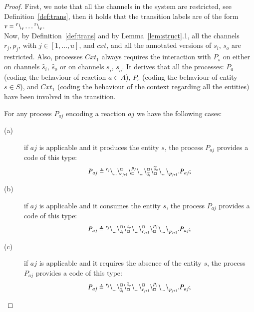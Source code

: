  \begin{proof}
 First, we note that all the channels in the system are restricted, see Definition~\ref{def:trans}, then
 it holds that the transition labels are of the form  $v={}^{\tau} \backslash_{\tau}^{}\dots{}^{\tau} \backslash_{\tau}^{}$.\\
 Now,
by Definition~\ref{def:trans} and by Lemma~\ref{lem:struct}.1, all the  channels $r_j,p_j$, with
 $j \in [1,\dots,u]$, and $cxt$,
  and all the annotated versions of 
 $s_i$, $s_o$ are restricted. Also, processes $\mathit{Cxt}_1$ always requires the 
 interaction with $P_s$ on either on channels $\widehat{s}_i$, $\widehat{s}_o$ or on channels 
 $\underline{s}_i$, $\underline{s}_o$.
 It derives that all the processes: $P_a$  (coding the behaviour of reaction $a \in A$), $P_s$ (coding the behaviour of entity $s \in S$), and $\mathit{Cxt}_1$ (coding the behaviour of the context regarding all the entities) have been involved in the transition. 

For any process $P_{aj}$ encoding a reaction $aj$ we have the following cases:
\begin{description}
\item[(a)] 
if $aj$ is applicable and it produces the entity $s$,  
the process $P_{aj}$ provides a code of this type:
$$P_{aj}\triangleq {}^{r_j} \backslash_{\dots}^{}\backslash_{r_{j+1}}^{\scriptstyle {\square}}\backslash_{\scriptstyle {\square}}^{p_j}{}^{} \backslash_{\dots}^{}\backslash_{\widetilde{s}_i}^{\scriptstyle {\square}}\backslash_{\scriptstyle {\square}}^{\widetilde{s}_o}{}^{} \backslash_{\dots}^{} \backslash_{p_{j+1}}^{}.P_{aj} ;$$

\item[(b)] 
 if $aj$ is applicable and it  consumes the entity $s$,
 the process $P_{aj}$ provides a code of this type: 
$$P_{aj}\triangleq {}^{r_j} \backslash_{\dots}^{}\backslash_{s_i}^{\scriptstyle {\square}}\backslash_{\scriptstyle {\square}}^{s_o}{}^{} \backslash_{\dots}^{} \backslash_{r_{j+1}}^{\scriptstyle {\square}}\backslash_{\scriptstyle {\square}}^{p_j}{}^{} \backslash_{\dots}^{}{}^{} \backslash_{p_{j+1}}^{}.P_{aj} ;$$

\item[(c)]  
 if $aj$ is applicable and it requires the absence of the entity $s$,
 the process $P_{aj}$  provides a code of this type: 
$$P_{aj}\triangleq {}^{r_j} \backslash_{\dots}^{}\backslash_{\overline{s}_i}^{\scriptstyle {\square}}\backslash_{\scriptstyle {\square}}^{\overline{s}_o}{}^{} \backslash_{\dots}^{} \backslash_{r_{j+1}}^{\scriptstyle {\square}}\backslash_{\scriptstyle {\square}}^{p_j}{}^{} \backslash_{\dots}^{}{}^{} \backslash_{p_{j+1}}^{}.P_{aj} ;$$


\end{description}
\end{proof}

